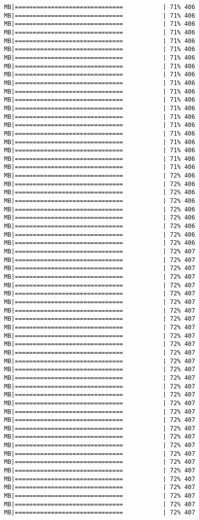 \documentclass[
]{article}
\begin{document}
\begin{verbatim}
MB|==============================           | 71% 406 MB|==============================           | 71% 406 MB|==============================           | 71% 406 MB|==============================           | 71% 406 MB|==============================           | 71% 406 MB|==============================           | 71% 406 MB|==============================           | 71% 406 MB|==============================           | 71% 406 MB|==============================           | 71% 406 MB|==============================           | 71% 406 MB|==============================           | 71% 406 MB|==============================           | 71% 406 MB|==============================           | 71% 406 MB|==============================           | 71% 406 MB|==============================           | 71% 406 MB|==============================           | 71% 406 MB|==============================           | 71% 406 MB|==============================           | 71% 406 MB|==============================           | 71% 406 MB|==============================           | 71% 406 MB|==============================           | 72% 406 MB|==============================           | 72% 406 MB|==============================           | 72% 406 MB|==============================           | 72% 406 MB|==============================           | 72% 406 MB|==============================           | 72% 406 MB|==============================           | 72% 406 MB|==============================           | 72% 406 MB|==============================           | 72% 406 MB|==============================           | 72% 407 MB|==============================           | 72% 407 MB|==============================           | 72% 407 MB|==============================           | 72% 407 MB|==============================           | 72% 407 MB|==============================           | 72% 407 MB|==============================           | 72% 407 MB|==============================           | 72% 407 MB|==============================           | 72% 407 MB|==============================           | 72% 407 MB|==============================           | 72% 407 MB|==============================           | 72% 407 MB|==============================           | 72% 407 MB|==============================           | 72% 407 MB|==============================           | 72% 407 MB|==============================           | 72% 407 MB|==============================           | 72% 407 MB|==============================           | 72% 407 MB|==============================           | 72% 407 MB|==============================           | 72% 407 MB|==============================           | 72% 407 MB|==============================           | 72% 407 MB|==============================           | 72% 407 MB|==============================           | 72% 407 MB|==============================           | 72% 407 MB|==============================           | 72% 407 MB|==============================           | 72% 407 MB|==============================           | 72% 407 MB|==============================           | 72% 407 MB|==============================           | 72% 407 MB|==============================           | 72% 407 MB|==============================           | 72% 407 
\end{verbatim}
\end{document}
